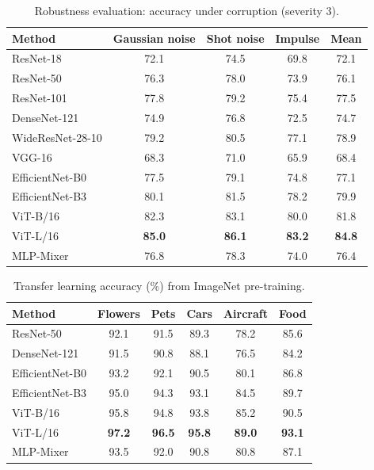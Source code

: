 \documentclass{article}
\begin{document}
\begin{table}[h]
\caption{Robustness evaluation: accuracy under corruption (severity 3).}
\label{tab:robust}
\centering
\begin{tabular}{lcccc}
\toprule
\textbf{Method} & \textbf{Gaussian noise} & \textbf{Shot noise} & \textbf{Impulse} & \textbf{Mean} \\
\midrule
ResNet-18       & 72.1 & 74.5 & 69.8 & 72.1 \\
ResNet-50       & 76.3 & 78.0 & 73.9 & 76.1 \\
ResNet-101      & 77.8 & 79.2 & 75.4 & 77.5 \\
DenseNet-121    & 74.9 & 76.8 & 72.5 & 74.7 \\
WideResNet-28-10 & 79.2 & 80.5 & 77.1 & 78.9 \\
VGG-16          & 68.3 & 71.0 & 65.9 & 68.4 \\
EfficientNet-B0 & 77.5 & 79.1 & 74.8 & 77.1 \\
EfficientNet-B3 & 80.1 & 81.5 & 78.2 & 79.9 \\
ViT-B/16        & 82.3 & 83.1 & 80.0 & 81.8 \\
ViT-L/16        & \textbf{85.0} & \textbf{86.1} & \textbf{83.2} & \textbf{84.8} \\
MLP-Mixer       & 76.8 & 78.3 & 74.0 & 76.4 \\
\bottomrule
\end{tabular}
\end{table}

\begin{table}[h]
\caption{Transfer learning accuracy (\%) from ImageNet pre-training.}
\label{tab:transfer}
\centering
\begin{tabular}{lccccc}
\toprule
\textbf{Method} & \textbf{Flowers} & \textbf{Pets} & \textbf{Cars} & \textbf{Aircraft} & \textbf{Food} \\
\midrule
ResNet-50       & 92.1 & 91.5 & 89.3 & 78.2 & 85.6 \\
DenseNet-121    & 91.5 & 90.8 & 88.1 & 76.5 & 84.2 \\
EfficientNet-B0 & 93.2 & 92.1 & 90.5 & 80.1 & 86.8 \\
EfficientNet-B3 & 95.0 & 94.3 & 93.1 & 84.5 & 89.7 \\
ViT-B/16        & 95.8 & 94.8 & 93.8 & 85.2 & 90.5 \\
ViT-L/16        & \textbf{97.2} & \textbf{96.5} & \textbf{95.8} & \textbf{89.0} & \textbf{93.1} \\
MLP-Mixer       & 93.5 & 92.0 & 90.8 & 80.8 & 87.1 \\
\bottomrule
\end{tabular}
\end{table}
\end{document}
